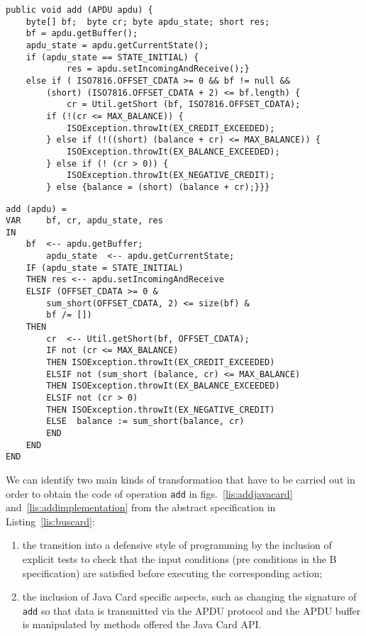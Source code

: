\documentclass{llncs}
\begin{document}
\begin{lstlisting}
public void add (APDU apdu) { 
	byte[] bf;  byte cr; byte apdu_state; short res;			
	bf = apdu.getBuffer();
	apdu_state = apdu.getCurrentState();
	if (apdu_state == STATE_INITIAL) { 
			res = apdu.setIncomingAndReceive();} 
	else if ( ISO7816.OFFSET_CDATA >= 0 && bf != null &&
		(short) (ISO7816.OFFSET_CDATA + 2) <= bf.length) {
			cr = Util.getShort (bf, ISO7816.OFFSET_CDATA);
		if (!(cr <= MAX_BALANCE)) {	
			ISOException.throwIt(EX_CREDIT_EXCEEDED);
		} else if (!((short) (balance + cr) <= MAX_BALANCE)) {
			ISOException.throwIt(EX_BALANCE_EXCEEDED);
		} else if (! (cr > 0)) { 
			ISOException.throwIt(EX_NEGATIVE_CREDIT);
		} else {balance = (short) (balance + cr);}}}
\end{lstlisting}

\begin{lstlisting}
add (apdu) = 
VAR 	bf, cr, apdu_state, res
IN
	bf  <-- apdu.getBuffer;		
    	apdu_state  <-- apdu.getCurrentState;
	IF (apdu_state = STATE_INITIAL) 
	THEN res <-- apdu.setIncomingAndReceive                
	ELSIF (OFFSET_CDATA >= 0 &
		sum_short(OFFSET_CDATA, 2) <= size(bf) & 
		bf /= [])
	THEN 
		cr  <-- Util.getShort(bf, OFFSET_CDATA);
		IF not (cr <= MAX_BALANCE)
		THEN ISOException.throwIt(EX_CREDIT_EXCEEDED)
		ELSIF not (sum_short (balance, cr) <= MAX_BALANCE)
		THEN ISOException.throwIt(EX_BALANCE_EXCEEDED)
		ELSIF not (cr > 0)
		THEN ISOException.throwIt(EX_NEGATIVE_CREDIT) 
		ELSE  balance := sum_short(balance, cr)
		END
	END
END
\end{lstlisting}

We can identify two main kinds of transformation that have to be
carried out in order to obtain the code of operation \texttt{add} in
figs.~\ref{lis:addjavacard} and~\ref{lis:addimplementation} from the
abstract specification in Listing~\ref{lis:buscard}:

\begin{enumerate}
\item the transition into a defensive style of programming by the
  inclusion of explicit tests to check that the input conditions (pre
  conditions in the B specification) are satisfied before executing
  the corresponding action;

\item the inclusion of Java Card specific aspects, such as changing
  the signature of \texttt{add} so that data is transmitted via the
  APDU protocol and the APDU buffer is manipulated by methods offered
  the Java Card API.

\end{enumerate}
\end{document}
